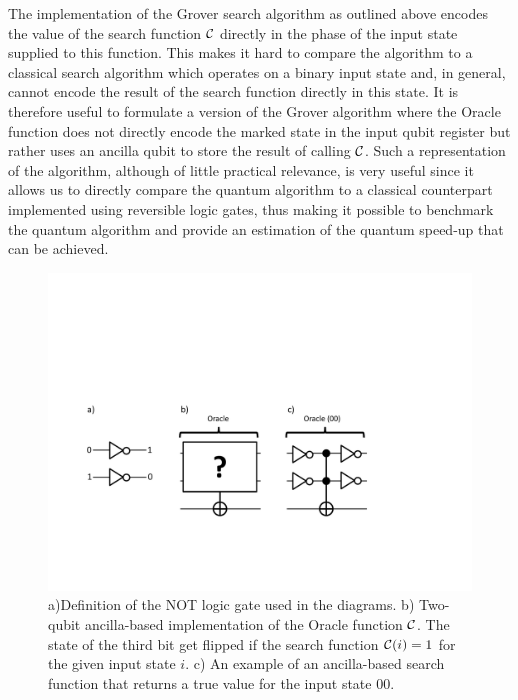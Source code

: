 The implementation of the Grover search algorithm as outlined above encodes the value of the search function $\Or$ directly in the phase of the input state supplied to this function. This makes it hard to compare the algorithm to a classical search algorithm which operates on a binary input state and, in general, cannot encode the result of the search function directly in this state. It is therefore useful to formulate a version of the Grover algorithm where the Oracle function does not directly encode the marked state in the input qubit register but rather uses an ancilla qubit to store the result of calling $\Or$. Such a representation of the algorithm, although of little practical relevance, is very useful since it allows us to directly compare the quantum algorithm to a classical counterpart implemented using reversible logic gates, thus making it possible to benchmark the quantum algorithm and provide an estimation of the quantum speed-up that can be achieved.

\begin{figure}[ht!]
	\centering
		\includegraphics[width=\textwidth]{./material/papers/grover/different_oracle_implementations}
	\caption[]{a)Definition of the NOT logic gate used in the diagrams. b) Two-qubit ancilla-based implementation of the Oracle function $\Or$. The state of the third bit get flipped if the search function $\Or(i)=1$ for the given input state $i$. c) An example of an ancilla-based search function that returns a true value for the input state $00$.}
	\label{fig:GroverOracleImplementations}
\end{figure}

